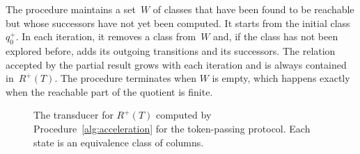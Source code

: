 The procedure maintains a set~$W$ of classes that have been found to be
reachable but whose successors have not yet been computed. It starts from the
initial class $q_0^+$. In each iteration, it removes a class from~$W$ and, if
the class has not been explored before, adds its outgoing transitions and its
successors. The relation accepted by the partial result grows with each
iteration and is always contained in~$R^+(T)$. The procedure terminates when
$W$ is empty, which happens exactly when the reachable part of the quotient is
finite.

\begin{figure}[t]
\centering
{}
\caption{The transducer for $R^+(T)$ computed by
Procedure~\ref{alg:acceleration} for the token-passing protocol. Each state is
an equivalence class of columns.}
\label{fig:quotient}
\end{figure}

